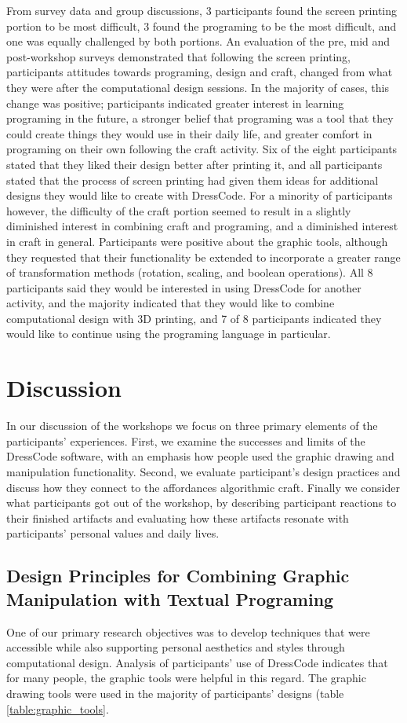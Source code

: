 \documentclass{sigchi}
\begin{document}
From survey data and group discussions, 3 participants found the screen printing portion to be most difficult, 3 found the programing to be the most difficult, and one was equally challenged by both portions. An evaluation of the pre, mid and post-workshop surveys demonstrated that following the screen printing, participants attitudes towards programing, design and craft, changed from what they were after the computational design sessions. In the majority of cases, this change was positive; participants indicated greater interest in learning programing in the future, a stronger belief that programing was a tool that they could create things they would use in their daily life, and greater comfort in programing on their own following the craft activity. Six of the eight participants stated that they liked their design better after printing it, and all participants stated that the process of screen printing had given them ideas for additional designs they would like to create with DressCode. For a minority of participants however, the difficulty of the craft portion seemed to result in a slightly diminished interest in combining craft and programing, and a diminished interest in craft in general. Participants were positive about the graphic tools, although they requested that their functionality be extended to incorporate a greater range of transformation methods (rotation, scaling, and boolean operations). All 8 participants said they would be interested in using DressCode for another activity, and the majority indicated that they would like to combine computational design with 3D printing, and 7 of 8 participants indicated they would like to continue using the programing language in particular.

\section{Discussion}
In our discussion of the workshops we focus on three primary elements of the participants' experiences. First, we examine the successes and limits of the DressCode software, with an emphasis how people used the graphic drawing and manipulation functionality. Second, we evaluate participant's design practices and discuss how they connect to the  affordances algorithmic craft. Finally we consider what participants got out of the workshop, by describing participant reactions to their finished artifacts and evaluating how these artifacts resonate with participants' personal values and daily lives.

\subsection{Design Principles for Combining Graphic Manipulation with Textual Programing}
	One of our primary research objectives was to develop techniques that were accessible while also supporting personal aesthetics and styles through computational design. Analysis of participants' use of DressCode indicates that for many people, the graphic tools were helpful in this regard. The graphic drawing tools were used in the majority of participants' designs (table \ref{table:graphic_tools}. 
\end{document}
